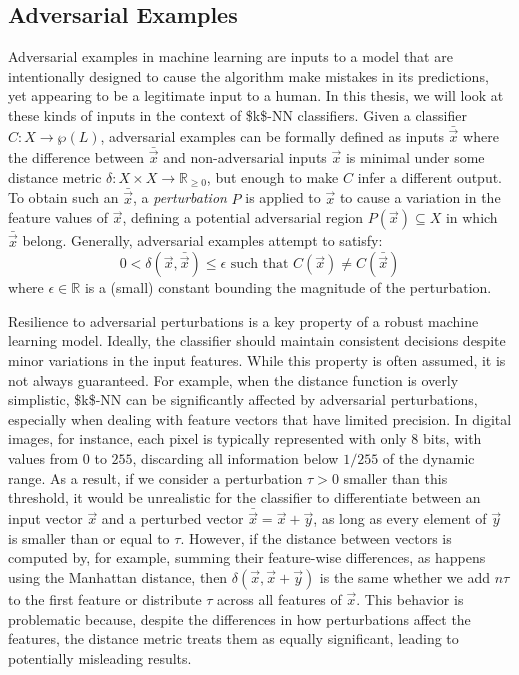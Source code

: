 \subsection{Adversarial Examples}
\label{subsec:adv-examples}

Adversarial examples in machine learning are inputs to a model that are intentionally designed to cause the algorithm make mistakes in its predictions, yet appearing to be a legitimate input to a human. In this thesis, we will look at these kinds of inputs in the context of \acs{$k$-NN} classifiers. Given a classifier $C\colon X \rightarrow \wp(L)$, adversarial examples can be formally defined as inputs $\bar{\vec{x}}$ where the difference between $\bar{\vec{x}}$ and non-adversarial inputs $\vec{x}$ is minimal under some distance metric $\delta\colon X \times X \rightarrow \mathbb{R}_{\geq 0}$, but enough to make $C$ infer a different output. To obtain such an $\bar{\vec{x}}$, a \emph{perturbation} $P$ is applied to $\vec{x}$ to cause a variation in the feature values of $\vec{x}$, defining a potential adversarial region $P(\vec{x}) \subseteq X$ in which $\bar{\vec{x}}$ belong. Generally, adversarial examples attempt to satisfy:
\begin{equation*}
	0 < \delta(\vec{x}, \bar{\vec{x}}) \leq \epsilon \text{ such that } C(\vec{x}) \neq C(\bar{\vec{x}})
\end{equation*}
where $\epsilon \in \mathbb{R}$ is a (small) constant bounding the magnitude of the perturbation.

Resilience to adversarial perturbations is a key property of a robust machine learning model. Ideally, the classifier should maintain consistent decisions despite minor variations in the input features. While this property is often assumed, it is not always guaranteed. For example, when the distance function is overly simplistic, \acs{$k$-NN} can be significantly affected by adversarial perturbations, especially when dealing with feature vectors that have limited precision. In digital images, for instance, each pixel is typically represented with only $8$ bits, with values from $0$ to $255$, discarding all information below $1/255$ of the dynamic range. As a result, if we consider a perturbation $\tau > 0$ smaller than this threshold, it would be unrealistic for the classifier to differentiate between an input vector $\vec{x}$ and a perturbed vector $\bar{\vec{x}} = \vec{x} + \vec{y}$, as long as every element of $\vec{y}$ is smaller than or equal to $\tau$. However, if the distance between vectors is computed by, for example, summing their feature-wise differences, as happens using the Manhattan distance, then $\delta(\vec{x}, \vec{x} + \vec{y})$  is the same whether we add $n\tau$ to the first feature or distribute $\tau$ across all features of $\vec{x}$. This behavior is problematic because, despite the differences in how perturbations affect the features, the distance metric treats them as equally significant, leading to potentially misleading results.

